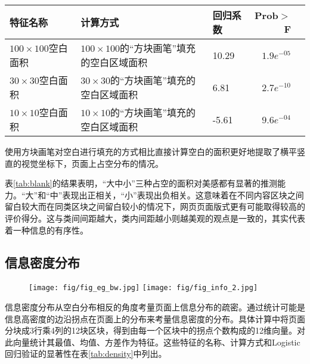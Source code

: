 \begin{table}[H]
  \centering
  \small
  \begin{tabular}{lllrr}
    \hline
     特征名称 & 计算方式 & 回归系数 & Prob$>$F \\
    \hline
    $100\times100$空白面积 & $100\times100$的“方块画笔”填充的空白区域面积 & 10.29 & $1.9e^{-05}$\\
    $30\times30$空白面积 & $30\times30$的“方块画笔”填充的空白区域面积 & 6.81 & $2.7e^{-10}$\\
    $10\times10$空白面积 & $10\times10$的“方块画笔”填充的空白区域面积 & -5.61 & $9.6e^{-04}$\\
    \hline
  \end{tabular}
\end{table}

\clearpage
使用方块画笔对空白进行填充的方式相比直接计算空白的面积更好地提取了横平竖直的视觉坐标下，页面上占空分布的情况。

表\ref{tab:blank}的结果表明，“大中小”三种占空的面积对美感都有显著的推测能力。“大”和“中”表现出正相关，“小”表现出负相关。这意味着在不同内容区块之间留白较大而在同类区块之间留白较小的情况下，网页页面版式更有可能取得较高的评价得分。这与类间间距越大，类内间距越小则越美观的观点是一致的，其实代表着一种信息的有序性。

\subsection{信息密度分布}
\begin{figure}[H]
  \texttt{[image: fig/fig\_eg\_bw.jpg]}
  \texttt{[image: fig/fig\_info\_2.jpg]}
\end{figure}

信息密度分布从空白分布相反的角度考量页面上信息分布的疏密。通过统计可能是信息高密度的边沿拐点在页面上的分布来考量信息密度的分布。具体计算中将页面分块成3行乘4列的12块区块，得到由每一个区块中的拐点个数构成的12维向量。对此向量统计其最值、均值、方差作为特征。这些特征的名称、计算方式和Logistic回归验证的显著性在表\ref{tab:density}中列出。

